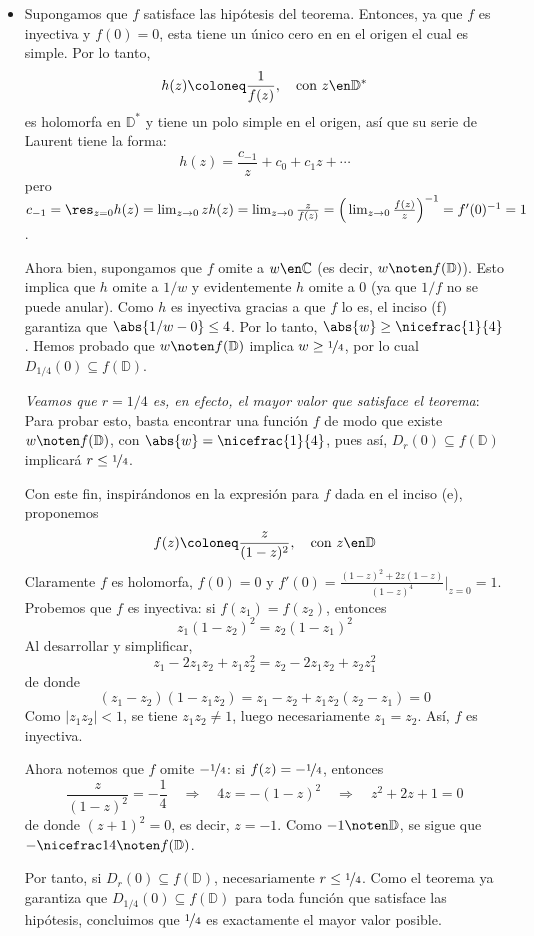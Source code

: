 \begin{sol}
\begin{itemize}[leftmargin=1.5em]
\item[(g)]
Supongamos que $f$ satisface las hipótesis del teorema. Entonces, ya que $f$ es inyectiva y $f(0) = 0$, esta tiene un único cero en en el origen el cual es simple. Por lo tanto,
\[
h(z) \coloneq \frac{1}{f(z)},
\quad\text{con } z\en\mathbb D^*
\]
es holomorfa en $\mathbb D^*$ y tiene un polo simple en el origen, así que su serie de Laurent tiene la forma:
\[
h(z) = \frac{c_{-1}}{z} + c_0 + c_1z+\cdots
\]
pero $c_{-1}=\res_{z=0}h(z) = \lim_{z\to0}zh(z) = \lim_{z\to0}\frac{z}{f(z)} = \Big(\lim_{z\to0}\frac{f(z)}{z}\Big)^{-1} = f'(0)^{-1} = 1$.\par
Ahora bien, supongamos que $f$ omite a $w\en\mathbb C$ (es decir, $w\noten f(\mathbb D)$). Esto implica que $h$ omite a $1/w$ y evidentemente $h$ omite a $0$ (ya que $1/f$ no se puede anular). Como $h$ es inyectiva gracias a que $f$ lo es, el inciso (f) garantiza que $\abs{1/w - 0} \le 4$. Por lo tanto, $\abs{w}\ge \nicefrac{1}{4}$. Hemos probado que $w\noten f(\mathbb D)$ implica $w \ge \nicefrac{1}{4}$, por lo cual $D_{1/4}(0) \subseteq f(\mathbb D)$.\par\vspace{1em}
\emph{Veamos que $r=1/4$ es, en efecto, el mayor valor que satisface el teorema}:\\
Para probar esto, basta encontrar una función $f$ de modo que existe $w \noten f(\mathbb D)$, con $\abs{w}=\nicefrac{1}{4}$, pues así, $D_r(0) \subseteq f(\mathbb D)$ implicará $r \le \nicefrac{1}{4}$.

Con este fin, inspirándonos en la expresión para $f$ dada en el inciso (e), proponemos
\[
f(z) \coloneq \frac{z}{(1-z)^2},
\quad\text{con }z\en\mathbb D
\]
Claramente $f$ es holomorfa, $f(0) =0$ y $f'(0) = \frac{(1-z)^2 + 2z(1-z)}{(1-z)^4} \Big|_{z=0} = 1$. Probemos que $f$ es inyectiva: si $f(z_1)=f(z_2)$, entonces
\[
z_1(1-z_2)^2=z_2(1-z_1)^2
\]
Al desarrollar y simplificar,
\[
z_1-2z_1z_2+z_1z_2^2
=
z_2-2z_1z_2+z_2z_1^2
\]
de donde
\[
(z_1-z_2)(1-z_1z_2)=z_1-z_2+z_1z_2(z_2-z_1)=0
\]
Como $|z_1z_2|<1$, se tiene $z_1z_2\neq 1$, luego necesariamente $z_1=z_2$. Así, $f$ es inyectiva.

Ahora notemos que $f$ omite $-\nicefrac{1}{4}$: si $f(z)=-\nicefrac14$, entonces
\[
\frac{z}{(1-z)^2}=-\frac14
\quad\Longrightarrow\quad
4z=-(1-z)^2
\quad\Longrightarrow\quad
z^2+2z+1=0
\]
de donde $(z+1)^2=0$, es decir, $z=-1$. Como $-1\noten\mathbb D$, se sigue que $-\nicefrac14\noten f(\mathbb D)$.

Por tanto, si $D_r(0)\subseteq f(\mathbb D)$, necesariamente $r\le \nicefrac14$. Como el teorema ya garantiza que $D_{1/4}(0)\subseteq f(\mathbb D)$ para toda función que satisface las hipótesis, concluimos que $\nicefrac14$ es exactamente el mayor valor posible. 
\end{itemize}
\end{sol}




